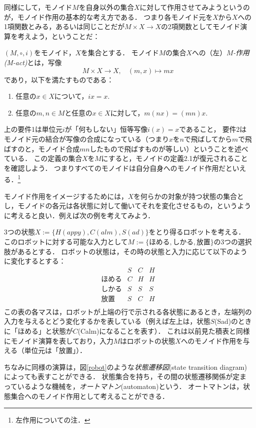 \documentclass[11pt,a4paper, dvipdfmx]{jsarticle}
\begin{document}
同様にして，モノイド$M$を自身以外の集合$X$に対して作用させてみようというのが，モノイド作用の基本的な考え方である．
つまり各モノイド元を$X$から$X$への1項関数とみる，あるいは同じことだが$M \times X \to X$の2項関数としてモノイド演算を考えよう，ということだ：

\begin{dfn}
 $(M, \circ, i)$をモノイド，$X$を集合とする．
 モノイド$M$の集合$X$への（左）\emph{$M$-作用(M-act)}とは，写像
 \[
  M \times X \to X, \ \ \ \ (m, x) \mapsto mx
 \]
 であり，以下を満たすものである：
 \begin{enumerate}
  \item 任意の$x \in X$について，$ix = x$.
  \item 任意の$m, n \in M$と任意の$x \in X$に対して，$m(nx) = (mn)x$.
 \end{enumerate}
\end{dfn}
上の要件1は単位元$i$が「何もしない」恒等写像$i(x)=x$であること，
要件2はモノイド元の結合が写像の合成になっている（つまり$x$を$n$で飛ばしてから$m$で飛ばすのと，モノイド合成$mn$したもので飛ばすものが等しい）ということを述べている．
この定義の集合$X$を$M$にすると，モノイドの定義2.1が復元されることを確認しよう．
つまりすべてのモノイドは自分自身へのモノイド作用だといえる．\footnote{左作用についての注．}

モノイド作用をイメージするためには，$X$を何らかの対象が持つ状態の集合とし，モノイドの各元は各状態に対して働いてそれを変化させるもの，というように考えると良い．例えば次の例を考えてみよう．
\begin{example}
 3つの状態$X := \{H(appy), C(alm), S(ad)\}$をとり得るロボットを考える．
 このロボットに対する可能な入力として$M := \{\text{ほめる}, \text{しかる}, \text{放置}\}$の3つの選択肢があるとする．
 ロボットの状態は，その時の状態と入力に応じて以下のように変化するとする：
 \[
\begin{array}{c|ccc}
       & S & C & H \\ \hline
     \text{ほめる}　& C & H & H \\
     \text{しかる}　& S & S & S \\ 
     \text{放置}　  & S & C & H\\
\end{array}
\]
この表の各マスは，ロボットが上端の行で示される各状態にあるとき，左端列の入力を与えるとどう変化するかを表している（例えば左上は，状態$S$(Sad)のときに「ほめる」と状態が$C$(Calm)になることを表す）．
これは以前見た積表と同様にモノイド演算を表しており，入力$M$はロボットの状態$X$へのモノイド作用を与える（単位元は「放置」）．

 
ちなみに同様の演算は，図\ref{robot}のような\emph{状態遷移図}(state transition diagram)によっても表すことができる．
状態集合を持ち，その間の状態遷移関係が定まっているような機械を，\emph{オートマトン}(automaton)という．
オートマトンは，状態集合へのモノイド作用として考えることができる．
\end{example}
\end{document}
